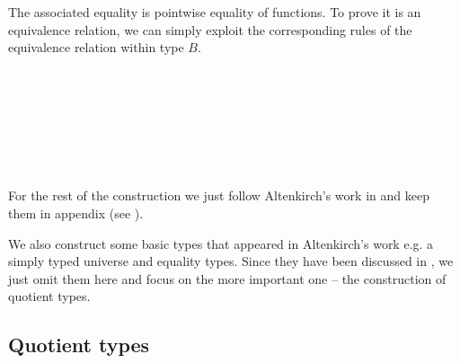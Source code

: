 The associated equality is pointwise equality of functions. To prove it is an equivalence relation, we can simply exploit the corresponding rules of the equivalence relation within type $B$.

\begin{code}
\\
\>[0]\<[9]%
\>[9]\AgdaSymbol{;}  \<[18]%
\>[18]\AgdaSymbol{=}  \AgdaInductiveConstructor{,} \AgdaSymbol{\_)} \AgdaSymbol{(} \AgdaInductiveConstructor{,} \AgdaSymbol{\_)}     \AgdaFunction{[}   \AgdaFunction{]}      \AgdaSymbol{\}}\<%
\\
\>[0]\<[9]%
\>[9]\AgdaSymbol{;}  \<[19]%
\>[19]\AgdaSymbol{=}    \AgdaFunction{[}  \AgdaSymbol{\_} \AgdaFunction{]refl} \<[40]%
\>[40]\<%
\\
\>[0]\<[9]%
\>[9]\AgdaSymbol{;}  \<[19]%
\>[19]\AgdaSymbol{=}     \AgdaFunction{[}  \AgdaSymbol{\_} \AgdaFunction{]sym} \AgdaSymbol{(} \AgdaSymbol{)}\<%
\\
\>[0]\<[9]%
\>[9]\AgdaSymbol{;}  \<[19]%
\>[19]\AgdaSymbol{=}      \AgdaFunction{[}  \AgdaSymbol{\_} \AgdaFunction{]trans} \AgdaSymbol{(} \AgdaSymbol{)} \AgdaSymbol{(} \AgdaSymbol{)}\<%
\\
\>[0]\<[9]%
\>[9]\AgdaSymbol{\}}\<%
\\
\end{code}

For the rest of the construction we just follow Altenkirch's work in \cite{alti:lics99} and keep them in appendix (see ).


We also construct some basic types that appeared in Altenkirch's work e.g. a simply typed universe and equality types. Since they have been discussed in \cite{alti:lics99}, we just omit them here and focus on the more important one -- the construction of quotient types.


\subsection{Quotient types}

